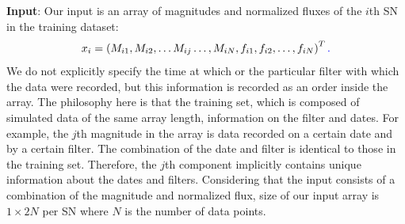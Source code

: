 \documentclass[proof]{pasj01}
\providecommand{\DIFadd}[1]{{\protect\color{blue} \sf #1}} %
\providecommand{\DIFdel}[1]{{\protect\color{red} \scriptsize #1}} %
\providecommand{\DIFaddbegin}{\protect\color{blue}} %
\providecommand{\DIFaddend}{\protect\color{black}} %
\providecommand{\DIFdelbegin}{\protect\color{red}} %
\providecommand{\DIFdelend}{\protect\color{black}} %
\newcommand{\DIFscaledelfig}{0.5}
\newlength{\DIFdelgraphicswidth} %
\newlength{\DIFdelgraphicsheight} %
\newcommand{\DIFaddincludegraphics}[2][]{{\color{blue}\fbox{\DIFOincludegraphics[#1]{#2}}}} %
\newcommand{\DIFdelincludegraphics}[2][]{%
\sbox{\DIFdelgraphicsbox}{\DIFOincludegraphics[#1]{#2}}%
\settoboxwidth{\DIFdelgraphicswidth}{\DIFdelgraphicsbox} %
\settoboxtotalheight{\DIFdelgraphicsheight}{\DIFdelgraphicsbox} %
\scalebox{\DIFscaledelfig}{%
\parbox[b]{\DIFdelgraphicswidth}{\usebox{\DIFdelgraphicsbox}\\[-\baselineskip] \rule{\DIFdelgraphicswidth}{0em}}\llap{\resizebox{\DIFdelgraphicswidth}{\DIFdelgraphicsheight}{%
\setlength{\unitlength}{\DIFdelgraphicswidth}%
\begin{picture}(1,1)%
\thicklines\linethickness{2pt} %
{\color[rgb]{1,0,0}\put(0,0){\framebox(1,1){}}}%
{\color[rgb]{1,0,0}\put(0,0){\line( 1,1){1}}}%
{\color[rgb]{1,0,0}\put(0,1){\line(1,-1){1}}}%
\end{picture}%
}\hspace*{3pt}}} %
} %
\DeclareRobustCommand{\DIFaddbegin}{\DIFOaddbegin \let\includegraphics\DIFaddincludegraphics} %
\DeclareRobustCommand{\DIFaddend}{\DIFOaddend \let\includegraphics\DIFOincludegraphics} %
\DeclareRobustCommand{\DIFdelbegin}{\DIFOdelbegin \let\includegraphics\DIFdelincludegraphics} %
\DeclareRobustCommand{\DIFdelend}{\DIFOaddend \let\includegraphics\DIFOincludegraphics} %
\begin{document}
%


{\bf Input}: Our input is an array of magnitudes and normalized fluxes of the $i$th SN in the training dataset:
\begin{equation}
      x_i = \left( M_{i1}, M_{i2}, \ldots M_{ij} \ldots , M_{iN}, f_{i1}, f_{i2}, \ldots, f_{iN} \right)^T\DIFaddbegin \DIFadd{.
}\DIFaddend \end{equation}
We do not explicitly specify the time at which or the particular filter with which the data were recorded, but this information is recorded as an order inside the array. The philosophy here is that the training set, which is composed of simulated data of the same array length, \DIFdelbegin \DIFdel{holds }\DIFdelend \DIFaddbegin \DIFadd{includes }\DIFaddend information on the filter and dates. For example, the $j$th magnitude in the array is data recorded on a certain date and by a certain filter. The combination of the date and filter is identical to those in the training set. Therefore, the $j$th component implicitly contains unique information about the dates and filters.  
Considering that the input consists of a combination of the magnitude and normalized flux,
\DIFdelbegin \DIFdel{the }\DIFdelend \DIFaddbegin \DIFadd{The }\DIFaddend size of our input array is $1\times2N$ per SN where $N$ is the number of data points.


\DIFdelbegin %
\end{document}
